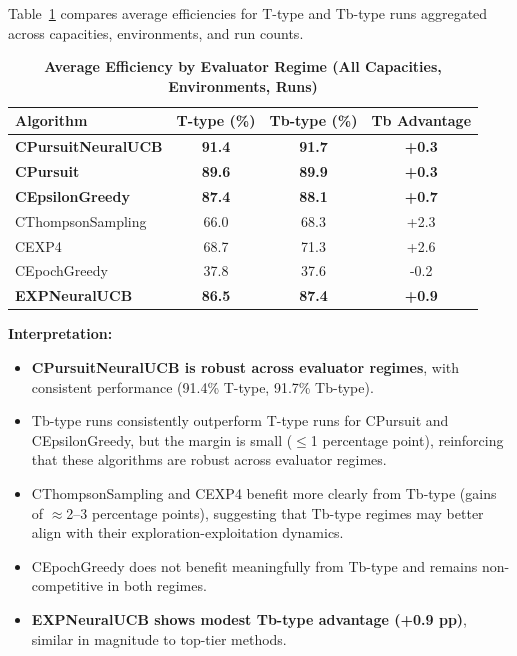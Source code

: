 \documentclass[12pt,a4paper]{article}
\newcommand{\performance}[1]{\textcolor{performancecolor}{\textbf{#1}}}
\newcommand{\legacy}[1]{\textcolor{legacycolor}{\textbf{#1}}}
\newcommand{\neural}[1]{\textcolor{neuralcolor}{\textbf{#1}}}
\begin{document}
Table~\ref{tab:regime-comparison} compares average efficiencies for T-type and Tb-type runs aggregated across capacities, environments, and run counts.

\begin{table}[H]
\centering
\caption{\performance{Average Efficiency by Evaluator Regime (All Capacities, Environments, Runs)}}
\label{tab:regime-comparison}
\begin{tabular}{|l|c|c|c|}
\hline
\textbf{Algorithm} & \textbf{T-type (\%)} & \textbf{Tb-type (\%)} & \textbf{Tb Advantage} \\
\hline
\hline
\neural{CPursuitNeuralUCB}   & \neural{91.4}     & \neural{91.7}     & \neural{+0.3} \\
\performance{CPursuit}        & \performance{89.6} & \performance{89.9} & \performance{+0.3} \\
\performance{CEpsilonGreedy} & \performance{87.4} & \performance{88.1} & \performance{+0.7} \\
CThompsonSampling            & 66.0              & 68.3              & +2.3 \\
CEXP4                        & 68.7              & 71.3              & +2.6 \\
CEpochGreedy                 & 37.8              & 37.6              & -0.2 \\
\legacy{EXPNeuralUCB}        & \legacy{86.5}     & \legacy{87.4}     & \legacy{+0.9} \\
\hline
\end{tabular}
\end{table}

\textbf{Interpretation:}
\begin{itemize}
\item \neural{CPursuitNeuralUCB is robust across evaluator regimes}, with consistent performance (91.4\% T-type, 91.7\% Tb-type).
\item Tb-type runs consistently outperform T-type runs for CPursuit and CEpsilonGreedy, but the margin is small ($\leq$1 percentage point), reinforcing that these algorithms are robust across evaluator regimes.
\item CThompsonSampling and CEXP4 benefit more clearly from Tb-type (gains of $\approx$2–3 percentage points), suggesting that Tb-type regimes may better align with their exploration-exploitation dynamics.
\item CEpochGreedy does not benefit meaningfully from Tb-type and remains non-competitive in both regimes.
\item \legacy{EXPNeuralUCB shows modest Tb-type advantage (+0.9 pp)}, similar in magnitude to top-tier methods.
\end{itemize}
\end{document}
